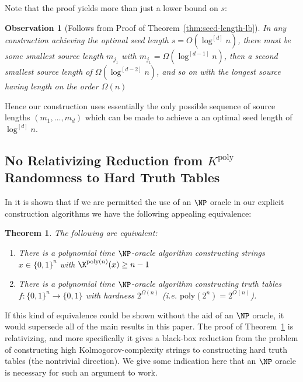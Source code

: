 \documentclass[11pt]{article}
\newtheorem{theorem}{Theorem}
\newtheorem{observation}{Observation}
\newcommand{\B}{\{0,1\}}
\renewcommand{\poly}{\mathrm{poly}}
\begin{document}
Note that the proof yields more than just a lower bound on $s$: 
\begin{observation}[Follows from Proof of Theorem~\ref{thm:seed-length-lb}]
In any construction achieving the optimal seed length $s = O(\log^{[d]}n)$, there must be some smallest source length $m_{j_1}$ with $m_{j_1}=\Omega(\log^{[d-1]}n)$, then a second smallest source length of $\Omega(\log^{[d-2]}n)$, and so on with the longest source having length on the order $\Omega(n)$
\end{observation}
Hence our construction uses essentially the only possible sequence of source lengths $(m_1,\ldots,m_d)$ which can be made to achieve a an optimal seed length of $\log^{[d]}n$. 

\subsection{No Relativizing Reduction from $K^{\mathrm{poly}}$ Randomness to Hard Truth Tables}

In \cite{Korten21} it is shown that if we are permitted the use of an $\NP$ oracle in our explicit construction algorithms we have the following appealing equivalence:

\begin{theorem}\label{thm:tt-K-equiv}
The following are equivalent:
\begin{enumerate}
    \item There is a polynomial time $\NP$-oracle algorithm constructing strings $x \in \B^n$ with $\K^{\poly(n)}(x) \geq n-1$
    \item There is a polynomial time $\NP$-oracle algorithm constructing truth tables $f: \B^{n} \to \B$ with hardness $2^{\Omega(n)}$ (i.e. $\poly(2^n) = 2^{O(n)}$).
\end{enumerate}
\end{theorem}

If this kind of equivalence could be shown without the aid of an $\NP$ oracle, it would supersede all of the main results in this paper. The proof of Theorem~\ref{thm:tt-K-equiv} is relativizing, and more specifically it gives a black-box reduction from the problem of constructing high Kolmogorov-complexity strings to constructing hard truth tables (the nontrivial direction). We give some indication here that an $\NP$ oracle is necessary for such an argument to work. 
\end{document}

